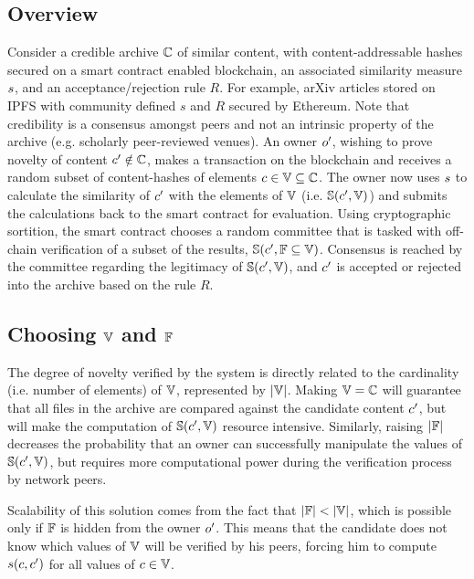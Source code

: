 \documentclass[conference]{IEEEtran}
\begin{document}
\subsection{Overview}\label{overview}
Consider a credible archive ${{\mathbb{C}}}$ of similar content, with content-addressable hashes secured on a smart contract enabled blockchain, an associated similarity measure ${s}$, and an acceptance/rejection rule $R$. For example, arXiv articles stored on IPFS with community defined $s$ and $R$ secured by Ethereum. Note that credibility is a consensus amongst peers and not an intrinsic property of the archive (e.g. scholarly peer-reviewed venues). An owner ${o}^\prime$,  wishing to prove novelty of content ${c}^\prime \notin {{\mathbb{C}}}$, makes a transaction on the blockchain and receives a random subset of content-hashes of elements ${c} \in {\mathbb{V}} \subseteq {{\mathbb{C}}}$. The owner now uses ${s}$ to calculate the similarity of ${c}^\prime$ with the elements of ${\mathbb{V}}$ (i.e. ${\mathbb{S}}({c}^\prime, {\mathbb{V}})$) and submits the calculations back to the smart contract for evaluation. Using cryptographic sortition, the smart contract chooses a random committee that is tasked with off-chain verification of a subset of the results, ${\mathbb{S}}({c}^\prime, {\mathbb{F}} \subseteq {\mathbb{V}})$. Consensus is reached by the committee regarding the legitimacy of ${\mathbb{S}}({c}^\prime, {\mathbb{V}})$, and ${c}^\prime$ is accepted or rejected into the archive based on the rule $R$.


\subsection{Choosing ${\mathbb{V}}$ and ${\mathbb{F}}$}
The degree of novelty verified by the system is directly related to the cardinality (i.e. number of elements) of ${\mathbb{V}}$, represented by $\vert{\mathbb{V}}\vert$. Making ${\mathbb{V}} = {{\mathbb{C}}}$ will guarantee that all files in the archive are compared against the candidate content ${c}^\prime$, but will make the computation of ${\mathbb{S}}({c}^\prime, {\mathbb{V}})$ resource intensive. Similarly, raising $\vert{\mathbb{F}}\vert$ decreases the probability that an owner can successfully manipulate the values of ${\mathbb{S}}({c}^\prime, {\mathbb{V}})$, but requires more computational power during the verification process by network peers.

Scalability of this solution comes from the fact that $\vert{\mathbb{F}}\vert < \vert{\mathbb{V}}\vert$, which is possible only if ${\mathbb{F}}$ is hidden from the owner ${o}^\prime$. This means that the candidate does not know which values of ${\mathbb{V}}$ will be verified by his peers, forcing him to compute ${s}({c},{c}^\prime)$ for all values of ${c} \in {\mathbb{V}}$.
\end{document}

